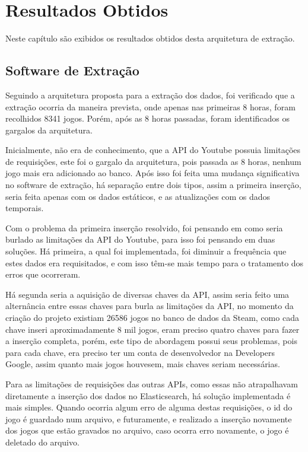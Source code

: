 \chapter[Resultados Obtidos]{Resultados Obtidos}
Neste capítulo são exibidos os resultados obtidos desta arquitetura de extração.

\section{Software de Extração}
Seguindo a arquitetura proposta para a extração dos dados, foi verificado que a extração ocorria da maneira prevista, onde apenas nas primeiras 8 horas, foram recolhidos 8341 jogos. Porém, após as 8 horas passadas, foram identificados os gargalos da arquitetura. 

Inicialmente, não era de conhecimento, que a API do Youtube possuia limitações de requisições, este foi o gargalo da arquitetura, pois passada as 8 horas, nenhum jogo mais era adicionado ao banco. Após isso foi feita uma mudança significativa no software de extração, há separação entre dois tipos, assim a primeira inserção, seria feita apenas com os dados estáticos, e as atualizações com os dados temporais.

Com o problema da primeira inserção resolvido, foi pensando em como seria burlado as limitações da API do Youtube, para isso foi pensando em duas soluções. Há primeira, a qual foi implementada, foi diminuir a frequência que estes dados era requisitados, e com isso têm-se mais tempo para o tratamento dos erros que ocorreram. 

Há segunda seria a aquisição de diversas chaves da API, assim seria feito uma alternância entre essas chaves para burla as limitações da API, no momento da criação do projeto existiam 26586 jogos no banco de dados da Steam, como cada chave inseri aproximadamente 8 mil jogos, eram preciso quatro chaves para fazer a inserção completa, porém, este tipo de abordagem possui seus problemas, pois para cada chave, era preciso ter um conta de desenvolvedor na Developers Google, assim quanto mais jogos houvesem, mais chaves seriam necessárias.

Para as limitações de requisições das outras APIs, como essas não atrapalhavam diretamente a inserção dos dados no Elasticsearch, há solução implementada é mais simples. Quando ocorria algum erro de alguma destas requisições, o id do jogo é guardado num arquivo, e futuramente, e realizado a inserção novamente dos jogos que estão gravados no arquivo, caso ocorra erro novamente, o jogo é deletado do arquivo.	

